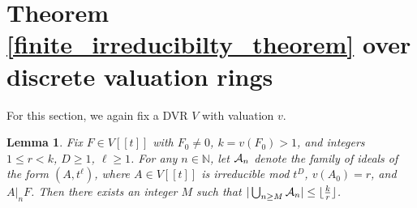 \documentclass{article}
\newcommand{\N}{\mathbb{N}}
\theoremstyle{plain}
\newtheorem{lemma}[theorem]{Lemma}
\theoremstyle{definition}
\theoremstyle{remark}
\DeclarePairedDelimiter\floor{\lfloor}{\rfloor}
\theoremstyle{plain}
\begin{document}

\section{Theorem \ref{finite_irreducibilty_theorem} over discrete valuation rings}\label{sec:dvr_case}

For this section, we again fix a DVR $V$ with valuation $v$.

\begin{lemma}\label{finite_set}
Fix $F \in V[[t]]$ with $F_0 \neq 0$, $k = v(F_0) > 1$, and integers $1 \leq r <k$, $D \geq 1$, $\ell \geq 1$. For any $n \in \N$, let ${\cal{A}}_n$ denote the family of ideals of the form $(A,t^\ell)$, where $A \in V[[t]]$ is irreducible mod $t^D$, $v(A_0) = r$, and $A|_n F$. Then there exists an integer $M$ such that  $|\bigcup_{n \geq M}{\cal{A}}_n| \leq \floor{\frac{k}{r}}$. \end{lemma}
\end{document}
